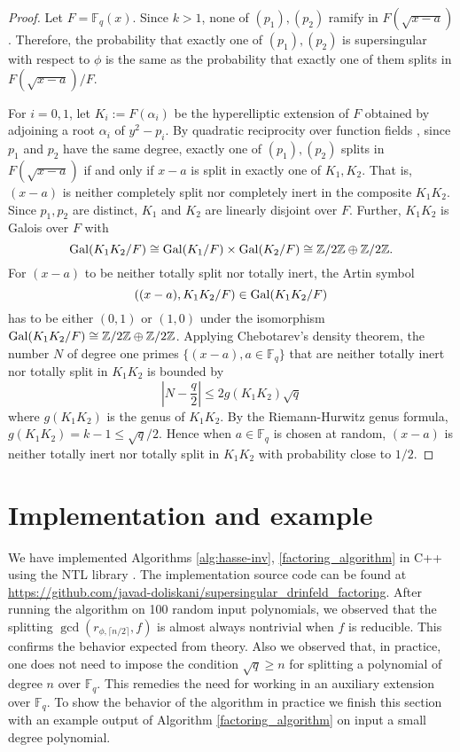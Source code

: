 \documentclass[12pt]{article}
\theoremstyle{plain}
\theoremstyle{definition}
\DeclareMathOperator{\gal}{{\rm Gal}} %
\def\Z{\ensuremath{\mathbb{Z}}}
\def\F{\ensuremath{\mathbb{F}}}
\begin{document}
\begin{proof}
	Let $F = \F_q(x)$. Since $k > 1$, none of $(p_1), (p_2)$ ramify in $F(\sqrt{x-a})$. Therefore, 
	the probability that exactly one of $(p_1), (p_2)$ is supersingular with respect to $\phi$ is 
	the same as the probability that exactly one of them splits in $F(\sqrt{x-a})/F$.
	
	For $i = 0, 1$, let $K_i:=F(\alpha_i)$ be the hyperelliptic extension of $F$ obtained by 
	adjoining a root $\alpha_i$ of $y^2-p_i$. By quadratic reciprocity over function fields 
	\cite{carlitz1932}, since $p_1$ and $p_2$ have the same degree, exactly one of $(p_1), (p_2)$ 
	splits in $F(\sqrt{x-a})$ if and only if $x-a$ is split in exactly one of $K_1, K_2$. That is, 
	$(x-a)$ is neither completely split nor completely inert in the composite $K_1K_2$. Since $p_1, 
	p_2$ are distinct, $K_1$ and $K_2$ are linearly disjoint over $F$. Further, $K_1K_2$ is Galois 
	over $F$ with 
	\[ \gal(K_1K_2/F) \cong \gal(K_1/F) \times \gal(K_2/F) \cong \Z/2\Z \oplus 
	\Z/2\Z. \]  
	For $(x-a)$ to be neither totally split nor totally inert, the Artin symbol 
	\[ ((x-a), K_1K_2/F) \in \gal(K_1K_2/F) \]
	has to be either $(0,1)$ or $(1,0)$ under the isomorphism $\gal(K_1K_2/F) \cong \Z/2\Z \oplus 
	\Z/2\Z$. Applying Chebotarev's density theorem, the number $N$ of degree one primes $\{(x-a), a 
	\in \F_q\}$ that are neither totally inert nor totally split in $K_1K_2$ is bounded by 
	\[ \left|N - \frac{q}{2} \right| \le 2 g(K_1K_2)\sqrt{q} \]
	where $g(K_1K_2)$ is the genus of $K_1K_2$. By the Riemann-Hurwitz genus formula, $g(K_1K_2) = 
	k-1 \le \sqrt{q}/2$. Hence when $a \in \F_q$ is chosen at random, $(x-a)$ is neither totally 
	inert nor totally split in $K_1K_2$ with probability close to $1/2$. 
\end{proof}






\section{Implementation and example}

We have implemented Algorithms \ref{alg:hasse-inv}, \ref{factoring_algorithm} in C++ using the NTL 
library \cite{shoup2001ntl}. The implementation source code can be found at 
\url{https://github.com/javad-doliskani/supersingular_drinfeld_factoring}. After running the 
algorithm on 100 random input polynomials, we observed that the splitting $\gcd(r_{\phi, \lceil n / 
2 \rceil}, f)$ is almost always nontrivial when $f$ is reducible. This confirms the behavior 
expected from theory. Also we observed that, in practice, one does not need to impose the condition 
$\sqrt{q} \ge n$ for splitting a polynomial of degree $n$ over $\F_q$. This remedies the need for 
working in an auxiliary extension over $\F_q$. To show the behavior of the algorithm in practice we 
finish this section with an example output of Algorithm \ref{factoring_algorithm} on input a small 
degree polynomial.
\end{document}
